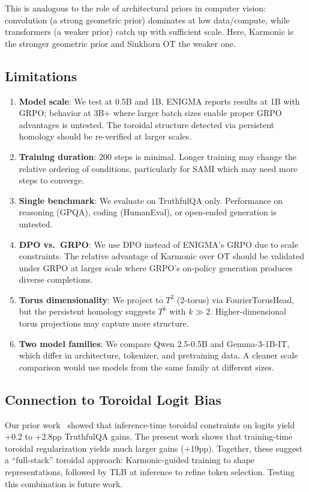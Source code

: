 \documentclass[11pt,a4paper]{article}
\begin{document}
This is analogous to the role of architectural priors in computer vision: convolution (a strong geometric prior) dominates at low data/compute, while transformers (a weaker prior) catch up with sufficient scale. Here, Karmonic is the stronger geometric prior and Sinkhorn OT the weaker one.

\subsection{Limitations}

\begin{enumerate}
    \item \textbf{Model scale}: We test at 0.5B and 1B. ENIGMA reports results at 1B with GRPO; behavior at 3B+ where larger batch sizes enable proper GRPO advantages is untested. The toroidal structure detected via persistent homology should be re-verified at larger scales.
    \item \textbf{Training duration}: 200 steps is minimal. Longer training may change the relative ordering of conditions, particularly for SAMI which may need more steps to converge.
    \item \textbf{Single benchmark}: We evaluate on TruthfulQA only. Performance on reasoning (GPQA), coding (HumanEval), or open-ended generation is untested.
    \item \textbf{DPO vs.\ GRPO}: We use DPO instead of ENIGMA's GRPO due to scale constraints. The relative advantage of Karmonic over OT should be validated under GRPO at larger scale where GRPO's on-policy generation produces diverse completions.
    \item \textbf{Torus dimensionality}: We project to $T^2$ (2-torus) via FourierTorusHead, but the persistent homology suggests $T^k$ with $k \gg 2$. Higher-dimensional torus projections may capture more structure.
    \item \textbf{Two model families}: We compare Qwen 2.5-0.5B and Gemma-3-1B-IT, which differ in architecture, tokenizer, and pretraining data. A cleaner scale comparison would use models from the same family at different sizes.
\end{enumerate}

\subsection{Connection to Toroidal Logit Bias}

Our prior work~\cite{cormier2026tlb} showed that inference-time toroidal constraints on logits yield +0.2 to +2.8pp TruthfulQA gains. The present work shows that training-time toroidal regularization yields much larger gains (+19pp). Together, these suggest a ``full-stack'' toroidal approach: Karmonic-guided training to shape representations, followed by TLB at inference to refine token selection. Testing this combination is future work.
\end{document}
